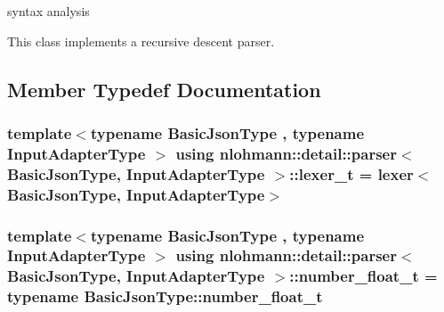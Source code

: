 syntax analysis 

This class implements a recursive descent parser. 

\subsection{Member Typedef Documentation}
\subsubsection[{\texorpdfstring{lexer\+\_\+t}{lexer_t}}]{\setlength{\rightskip}{0pt plus 5cm}template$<$typename Basic\+Json\+Type , typename Input\+Adapter\+Type $>$ using {\bf nlohmann\+::detail\+::parser}$<$ Basic\+Json\+Type, Input\+Adapter\+Type $>$\+::{\bf lexer\+\_\+t} =  {\bf lexer}$<$Basic\+Json\+Type, Input\+Adapter\+Type$>$\hspace{0.3cm}{\ttfamily [private]}}\hypertarget{classnlohmann_1_1detail_1_1parser_a5fbd320c5b713fda15d467e8455e4298}{}\label{classnlohmann_1_1detail_1_1parser_a5fbd320c5b713fda15d467e8455e4298}
\subsubsection[{\texorpdfstring{number\+\_\+float\+\_\+t}{number_float_t}}]{\setlength{\rightskip}{0pt plus 5cm}template$<$typename Basic\+Json\+Type , typename Input\+Adapter\+Type $>$ using {\bf nlohmann\+::detail\+::parser}$<$ Basic\+Json\+Type, Input\+Adapter\+Type $>$\+::{\bf number\+\_\+float\+\_\+t} =  typename Basic\+Json\+Type\+::number\+\_\+float\+\_\+t\hspace{0.3cm}{\ttfamily [private]}}\hypertarget{classnlohmann_1_1detail_1_1parser_aaf0c8640d0360fca5334314f0a7e9bad}{}\label{classnlohmann_1_1detail_1_1parser_aaf0c8640d0360fca5334314f0a7e9bad}
